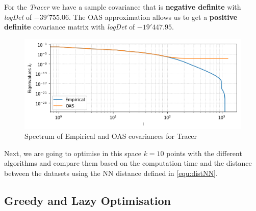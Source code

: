 For the \textit{Tracer} we have a sample covariance that is \textbf{negative definite} with \textit{logDet} of $-39'755.06$. The OAS approximation allows us to get a \textbf{positive definite} covariance matrix with \textit{logDet} of $-19'447.95$.  \\


\begin{figure}[h!]
\centering
    \includegraphics[width=0.7\linewidth]{figures/CompAlg/covarianceEmpOAS}
    \caption{Spectrum of Empirical and OAS covariances for Tracer}
    \label{fig:small_cov_eig:tracer}
\end{figure}


Next, we are going to optimise in this space $k=10$ points with the different algorithms and compare them based on the computation time and the distance between the datasets using the NN distance defined in \ref{equ:distNN}. 



\subsection{Greedy and Lazy Optimisation}

